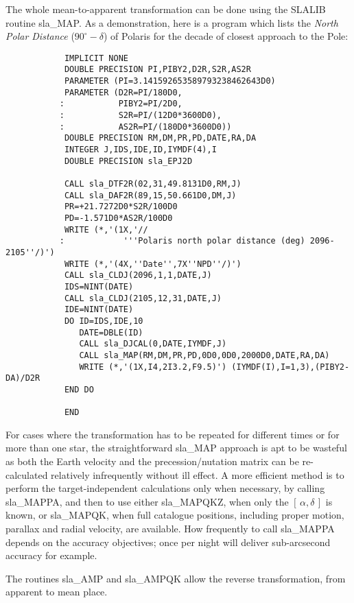 \documentclass[11pt,twoside]{article}
\newcommand{\radec}     {$[\,\alpha,\delta\,]$}
\begin{document}
The whole mean-to-apparent transformation can be done using the SLALIB
routine
sla\_MAP.  As a demonstration, here is a program which lists the
{\it North Polar Distance}\/ ($90^\circ-\delta$) of Polaris for
the decade of closest approach to the Pole:
\goodbreak
\begin{verbatim}
            IMPLICIT NONE
            DOUBLE PRECISION PI,PIBY2,D2R,S2R,AS2R
            PARAMETER (PI=3.141592653589793238462643D0)
            PARAMETER (D2R=PI/180D0,
           :           PIBY2=PI/2D0,
           :           S2R=PI/(12D0*3600D0),
           :           AS2R=PI/(180D0*3600D0))
            DOUBLE PRECISION RM,DM,PR,PD,DATE,RA,DA
            INTEGER J,IDS,IDE,ID,IYMDF(4),I
            DOUBLE PRECISION sla_EPJ2D

            CALL sla_DTF2R(02,31,49.8131D0,RM,J)
            CALL sla_DAF2R(89,15,50.661D0,DM,J)
            PR=+21.7272D0*S2R/100D0
            PD=-1.571D0*AS2R/100D0
            WRITE (*,'(1X,'//
           :            '''Polaris north polar distance (deg) 2096-2105''/)')
            WRITE (*,'(4X,''Date'',7X''NPD''/)')
            CALL sla_CLDJ(2096,1,1,DATE,J)
            IDS=NINT(DATE)
            CALL sla_CLDJ(2105,12,31,DATE,J)
            IDE=NINT(DATE)
            DO ID=IDS,IDE,10
               DATE=DBLE(ID)
               CALL sla_DJCAL(0,DATE,IYMDF,J)
               CALL sla_MAP(RM,DM,PR,PD,0D0,0D0,2000D0,DATE,RA,DA)
               WRITE (*,'(1X,I4,2I3.2,F9.5)') (IYMDF(I),I=1,3),(PIBY2-DA)/D2R
            END DO

            END
\end{verbatim}
\goodbreak
For cases where the transformation has to be repeated for different
times or for more than one star, the straightforward
sla\_MAP
approach is apt to be
wasteful as both the Earth velocity and the
precession/nutation matrix can be re-calculated relatively
infrequently without ill effect.  A more efficient method is to
perform the target-independent calculations only when necessary,
by calling
sla\_MAPPA,
and then to use either
sla\_MAPQKZ,
when only the \radec\/ is known, or
sla\_MAPQK,
when full catalogue positions, including proper motion, parallax and
radial velocity, are available.  How frequently to call
sla\_MAPPA
depends on the accuracy objectives;  once per
night will deliver sub-arcsecond accuracy for example.

The routines
sla\_AMP
and
sla\_AMPQK
allow the reverse transformation, from apparent to mean place.
\end{document}
